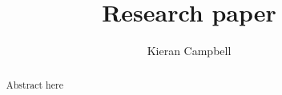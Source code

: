 \documentclass[12pt]{article}
\title{%
\textbf{Research paper}
}
\author{
Kieran Campbell \\
}
\begin{document}
\maketitle
\bigskip

\begin{abstract}
Abstract here
\end{abstract}


\clearpage
\glsresetall{}


\clearpage




\clearpage
\appendix
\end{document}
